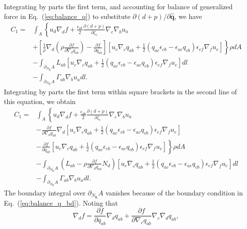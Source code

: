 \documentclass[12pt]{iopart}
\newcommand\eqref[1]{(\ref{#1})}
\begin{document}
Integrating by parts the first term, and accounting for balance of generalized force in Eq.~\eqref{eq:balance_q} to substitute $\partial(d+p)/\partial\widehat{\bm{q}}$, we have 
\begin{eqnarray}
C_1 = &\int_A \left\{ u_d \nabla_d f + \frac{\epsilon_{ab}}{2} \frac{\partial ( d+ p)}{\partial {\zeta}_c} \nabla_c \nabla_b {u}_a  \right. \nonumber \\ & \left. + \left[\frac{1}{\rho}\nabla_d \left(\rho \frac{\partial f}{\partial \nabla_d q_{ab}} \right) - \frac{\partial f}{\partial q_{ab}}\right] \left[ {u}_c\nabla_c{q}_{ab} + \frac{1}{2}\left({q}_{ac} {\epsilon}_{cb} -{\epsilon}_{ac}{q}_{cb} \right) {\epsilon}_{ef}\nabla_f{u}_e\right] \right\}\rho dA \nonumber\\
&- \int_{\partial_{N_{\bm{L}}} A} L_{ab} \left[ {u}_c\nabla_c{q}_{ab} + \frac{1}{2}\left({q}_{ac} {\epsilon}_{cb} -{\epsilon}_{ac}{q}_{cb} \right) {\epsilon}_{ef}\nabla_f{u}_e\right]dl \nonumber\\& -\int_{\partial_{N_{\bm{\Gamma}}} A} \Gamma_{ab} \nabla_b u_a dl.
\end{eqnarray}
Integrating by parts the first term within square brackets in the second line of this equation, we obtain
\begin{eqnarray}
C_1 = &\int_A \left\{ u_d \nabla_d f + \frac{\epsilon_{ab}}{2} \frac{\partial ( d+ p)}{\partial {\zeta}_c} \nabla_c \nabla_b {u}_a  \right. \nonumber \\  
& -  \frac{\partial f}{\partial \nabla_d q_{ab}} \nabla_d\left[ {u}_c\nabla_c{q}_{ab} + \frac{1}{2}\left({q}_{ac} {\epsilon}_{cb} -{\epsilon}_{ac}{q}_{cb} \right) {\epsilon}_{ef}\nabla_f{u}_e\right]  \nonumber\\
&\left.  - \frac{\partial f}{\partial q_{ab}} \left[ {u}_c\nabla_c{q}_{ab} + \frac{1}{2}\left({q}_{ac} {\epsilon}_{cb} -{\epsilon}_{ac}{q}_{cb} \right) {\epsilon}_{ef}\nabla_f{u}_e\right] \right\}\rho dA \nonumber\\
&- \int_{\partial_{N_{\bm{L}}} A}\left( L_{ab} - \rho \frac{\partial f}{\partial \nabla_d q_{ab}} N_d \right)\left[ {u}_c\nabla_c{q}_{ab} + \frac{1}{2}\left({q}_{ac} {\epsilon}_{cb} -{\epsilon}_{ac}{q}_{cb} \right) {\epsilon}_{ef}\nabla_f{u}_e\right]dl \nonumber\\& -\int_{\partial_{N_{\bm{\Gamma}}} A} \Gamma_{ab} \nabla_b u_a dl.
\end{eqnarray}
The boundary integral over $\partial_{N_{\bm{L}}} A$ vanishes because of the boundary condition in Eq.~\eqref{eq:balance_q_bd}. Noting that 
\begin{equation}
\nabla_d f = \frac{\partial f}{\partial q_{ab}}\nabla_d q_{ab} + \frac{\partial f}{\partial \nabla_c q_{ab}} \nabla_c \nabla_d q_{ab}, 
\end{equation}
\end{document}
